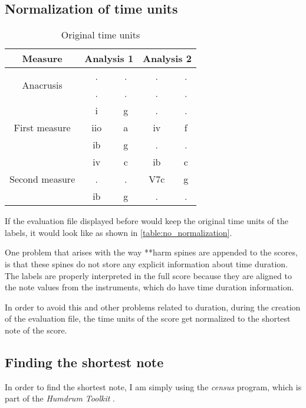   \subsection{Normalization of time units}

	\begin{table}[]
	\centering
	\begin{tabular}{|c|c|c|c|c|}
	\hline
	Measure & \multicolumn{2}{c|}{Analysis 1} & \multicolumn{2}{c|}{Analysis 2} \\ \hline
	\multirow{2}{*}{Anacrusis} & . & . & . & . \\ \cline{2-5}
	 & . & . & . & . \\ \hline
	\multirow{3}{*}{First measure} & i & g & . & . \\ \cline{2-5}
	 & iio & a & iv & f \\ \cline{2-5}
	 & ib & g & . & . \\ \hline
	\multirow{3}{*}{Second measure} & iv & c & ib & c \\ \cline{2-5}
	 & . & . & V7c & g \\ \cline{2-5}
	 & ib & g & . & . \\ \hline
	\end{tabular}
	\caption{Original time units}
	\label{table:no_normalization}
	\end{table}

	If the evaluation file displayed before would keep the original time units of the labels, it would look like as shown in \autoref{table:no_normalization}.

	One problem that arises with the way **harm spines are appended to the scores, is that these spines do not store any explicit information about time duration. The labels are properly interpreted in the full score because they are aligned to the note values from the instruments, which do have time duration information.

	In order to avoid this and other problems related to duration, during the creation of the evaluation file, the time units of the score get normalized to the shortest note of the score.

	\subsection{Finding the shortest note}
		In order to find the shortest note, I am simply using the \emph{census} program, which is part of the \emph{Humdrum Toolkit} \cite{humdrum}.

